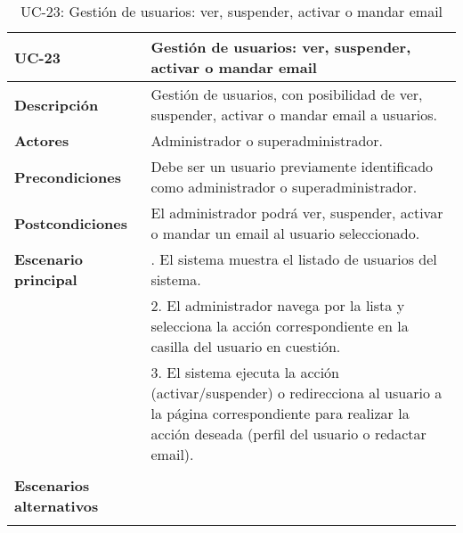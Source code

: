 \begin{table}[H]
  \begin{center}
    \begin{tabularx}{16.4cm}{|l|X|}
      \hline
      \textbf{UC-23} & \textbf{Gestión de usuarios: ver, suspender, activar o mandar email}\\
      \hline
      \textbf{Descripción} & Gestión de usuarios, con posibilidad de ver, suspender, activar o mandar email a usuarios.\\
      \hline
      \textbf{Actores} & Administrador o superadministrador.\\
      \hline
      \textbf{Precondiciones} & Debe ser un usuario previamente identificado como administrador o superadministrador.\\
      \hline
      \textbf{Postcondiciones} & El administrador podrá ver, suspender, activar o mandar un email al usuario seleccionado.\\
      \hline
      \textbf{Escenario principal} & \smallskip 1. El sistema muestra el listado de usuarios del sistema.\\
      & 2. El administrador navega por la lista y selecciona la acción correspondiente en la casilla del usuario en cuestión.\\
      & 3. El sistema ejecuta la acción (activar/suspender) o redirecciona al usuario a la página correspondiente para realizar la acción deseada (perfil del usuario o redactar email).\\
      & \\
      \hline
      \textbf{Escenarios alternativos} & \\
      & \\
      \hline
    \end{tabularx}
    \caption{UC-23: Gestión de usuarios: ver, suspender, activar o mandar email}
  \end{center}
\end{table}


